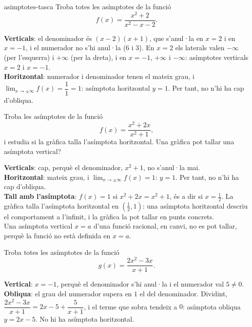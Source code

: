 \begin{apartats}

\begin{tria}{asimptotes-tasca}
Troba totes les asímptotes de la funció
\[
f(x)=\frac{x^2+2}{x^2-x-2} .
\]

\begin{solucio}
\textbf{Verticals}: el denominador és $(x-2)(x+1)$, que s'anul·la en $x=2$ i en $x=-1$, i el numerador
no s'hi anul·la ($6$ i $3$). En $x=2$ els laterals valen $-\infty$ (per l'esquerra) i $+\infty$ (per
la dreta), i en $x=-1$, $+\infty$ i $-\infty$: asímptotes verticals $\boxed{x=2}$ i $\boxed{x=-1}$.\\
\textbf{Horitzontal}: numerador i denominador tenen el mateix grau, i
$\lim_{x\to\pm\infty}f(x)=\dfrac11=1$: asímptota horitzontal $\boxed{y=1}$. Per tant, no n'hi ha
cap d'obliqua.
\end{solucio}

Troba les asímptotes de la funció
\[
f(x)=\frac{x^2+2x}{x^2+1} ,
\]
i estudia si la gràfica talla l'asímptota horitzontal. Una gràfica pot tallar una asímptota vertical?

\begin{solucio}
\textbf{Verticals}: cap, perquè el denominador, $x^2+1$, no s'anul·la mai.\\
\textbf{Horitzontal}: mateix grau, i $\lim_{x\to\pm\infty}f(x)=1$: $\boxed{y=1}$. Per tant, no n'hi ha
cap d'obliqua.\\
\textbf{Tall amb l'asímptota}: $f(x)=1$ si $x^2+2x=x^2+1$, és a dir si $x=\tfrac12$. La gràfica talla
l'asímptota horitzontal en $\left(\tfrac12,1\right)$: una asímptota horitzontal descriu el
comportament a l'infinit, i la gràfica la pot tallar en punts concrets.\\
Una asímptota vertical $x=a$ d'una funció racional, en canvi, no es pot tallar, perquè la funció no
està definida en $x=a$.
\end{solucio}
\end{tria}

\begin{nomesllarg}
Troba totes les asímptotes de la funció
\[
g(x)=\frac{2x^2-3x}{x+1} .
\]

\begin{solucio}
\textbf{Vertical}: $x=-1$, perquè el denominador s'hi anul·la i el numerador val $5\neq0$.\\
\textbf{Obliqua}: el grau del numerador supera en $1$ el del denominador. Dividint,
$\dfrac{2x^2-3x}{x+1}=2x-5+\dfrac{5}{x+1}$, i el terme que sobra tendeix a $0$: asímptota obliqua
$\boxed{y=2x-5}$. No hi ha asímptota horitzontal.
\end{solucio}
\end{nomesllarg}


\end{apartats}

